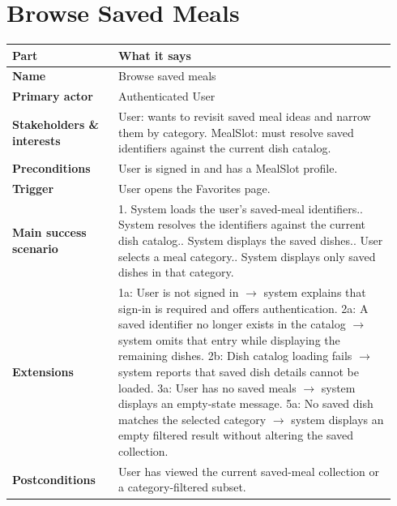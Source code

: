\documentclass[11pt,twocolumn]{article}
\newcommand{\ucheader}{%
\textbf{Part} & \textbf{What it says} \\
\hline
\endhead
\hline
\endfoot
}
\begin{document}
\section{Browse Saved Meals}
{\footnotesize
\begin{longtable}{@{}p{0.26\linewidth}p{0.68\linewidth}@{}}
\hline
\ucheader
\textbf{Name} & Browse saved meals \\
\hline
\textbf{Primary actor} & Authenticated User \\
\hline
\textbf{Stakeholders \& interests} & User: wants to revisit saved meal ideas and narrow them by category. MealSlot: must resolve saved identifiers against the current dish catalog. \\
\hline
\textbf{Preconditions} & User is signed in and has a MealSlot profile. \\
\hline
\textbf{Trigger} & User opens the Favorites page. \\
\hline
\textbf{Main success scenario} & 1. System loads the user's saved-meal identifiers.\newline
2. System resolves the identifiers against the current dish catalog.\newline
3. System displays the saved dishes.\newline
4. User selects a meal category.\newline
5. System displays only saved dishes in that category. \\
\hline
\textbf{Extensions} & 1a: User is not signed in $\rightarrow$ system explains that sign-in is required and offers authentication.\newline
2a: A saved identifier no longer exists in the catalog $\rightarrow$ system omits that entry while displaying the remaining dishes.\newline
2b: Dish catalog loading fails $\rightarrow$ system reports that saved dish details cannot be loaded.\newline
3a: User has no saved meals $\rightarrow$ system displays an empty-state message.\newline
5a: No saved dish matches the selected category $\rightarrow$ system displays an empty filtered result without altering the saved collection. \\
\hline
\textbf{Postconditions} & User has viewed the current saved-meal collection or a category-filtered subset. \\
\hline
\end{longtable}
}
\end{document}
